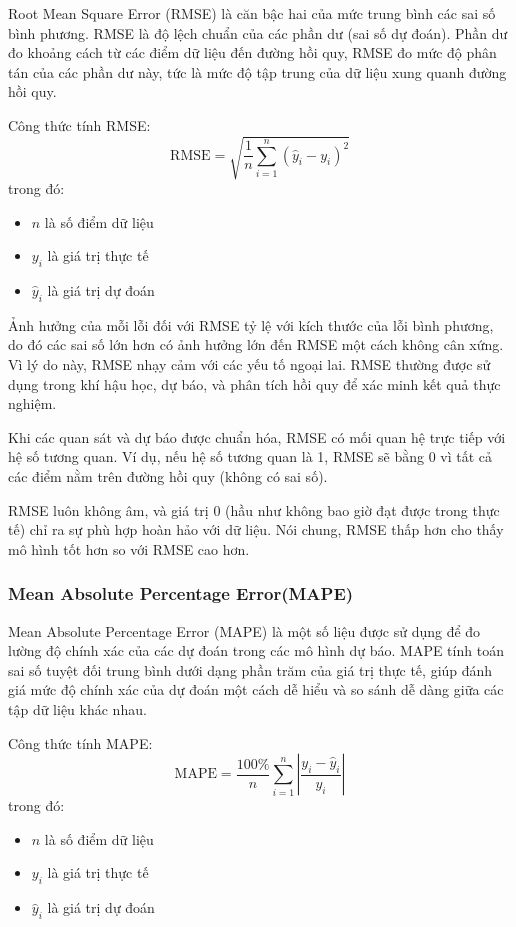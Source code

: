 \documentclass{article}
\begin{document}
\begin{multicols}{2}
Root Mean Square Error (RMSE) là căn bậc hai của mức trung bình các sai số bình phương. RMSE là độ lệch chuẩn của các phần dư (sai số dự đoán). Phần dư đo khoảng cách từ các điểm dữ liệu đến đường hồi quy, RMSE đo mức độ phân tán của các phần dư này, tức là mức độ tập trung của dữ liệu xung quanh đường hồi quy.

Công thức tính RMSE:
\[
\text{RMSE} = \sqrt{\frac{1}{n} \sum_{i=1}^{n} (\hat{y}_i - y_i)^2}
\]
trong đó:
\begin{itemize}
    \item $n$ là số điểm dữ liệu
    \item $y_i$ là giá trị thực tế
    \item $\hat{y}_i$ là giá trị dự đoán
\end{itemize}

Ảnh hưởng của mỗi lỗi đối với RMSE tỷ lệ với kích thước của lỗi bình phương, do đó các sai số lớn hơn có ảnh hưởng lớn đến RMSE một cách không cân xứng. Vì lý do này, RMSE nhạy cảm với các yếu tố ngoại lai. RMSE thường được sử dụng trong khí hậu học, dự báo, và phân tích hồi quy để xác minh kết quả thực nghiệm.

Khi các quan sát và dự báo được chuẩn hóa, RMSE có mối quan hệ trực tiếp với hệ số tương quan. Ví dụ, nếu hệ số tương quan là 1, RMSE sẽ bằng 0 vì tất cả các điểm nằm trên đường hồi quy (không có sai số).

RMSE luôn không âm, và giá trị 0 (hầu như không bao giờ đạt được trong thực tế) chỉ ra sự phù hợp hoàn hảo với dữ liệu. Nói chung, RMSE thấp hơn cho thấy mô hình tốt hơn so với RMSE cao hơn.

 

\subsubsection{Mean Absolute Percentage Error(MAPE)}

Mean Absolute Percentage Error (MAPE) là một số liệu được sử dụng để đo lường độ chính xác của các dự đoán trong các mô hình dự báo. MAPE tính toán sai số tuyệt đối trung bình dưới dạng phần trăm của giá trị thực tế, giúp đánh giá mức độ chính xác của dự đoán một cách dễ hiểu và so sánh dễ dàng giữa các tập dữ liệu khác nhau.

Công thức tính MAPE:
\[
\text{MAPE} = \frac{100\%}{n} \sum_{i=1}^{n} \left| \frac{y_i - \hat{y}_i}{y_i} \right|
\]
trong đó:
\begin{itemize}
    \item $n$ là số điểm dữ liệu
    \item $y_i$ là giá trị thực tế
    \item $\hat{y}_i$ là giá trị dự đoán
\end{itemize}


\end{multicols}
\end{document}
